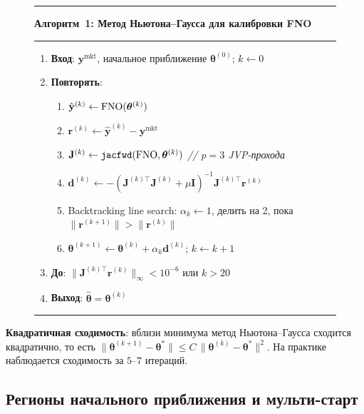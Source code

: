 \begin{figure}[H]
\hrule\vspace{0.4em}
\noindent\textbf{Алгоритм~1: Метод Ньютона--Гаусса для калибровки FNO}
\vspace{0.3em}\hrule\vspace{0.4em}
\begin{enumerate}[leftmargin=2em, label=\arabic*.]
  \item \textbf{Вход}: $\mathbf{y}^{\mathrm{mkt}}$, начальное приближение $\boldsymbol\theta^{(0)}$; $k \leftarrow 0$
  \item \textbf{Повторять}:
  \begin{enumerate}[leftmargin=1.5em, label=\alph*.]
    \item $\hat{\mathbf{y}}^{(k)} \leftarrow \mathrm{FNO}(\boldsymbol\theta^{(k)})$
    \item $\mathbf{r}^{(k)} \leftarrow \hat{\mathbf{y}}^{(k)} - \mathbf{y}^{\mathrm{mkt}}$
    \item $\mathbf{J}^{(k)} \leftarrow \texttt{jacfwd}(\mathrm{FNO}, \boldsymbol\theta^{(k)})$ \quad \textit{// $p=3$ JVP-прохода}
    \item $\mathbf{d}^{(k)} \leftarrow -(\mathbf{J}^{(k)\top}\mathbf{J}^{(k)} + \mu\mathbf{I})^{-1}\mathbf{J}^{(k)\top}\mathbf{r}^{(k)}$
    \item Backtracking line search: $\alpha_k \leftarrow 1$, делить на 2, пока $\|\mathbf{r}^{(k+1)}\| > \|\mathbf{r}^{(k)}\|$
    \item $\boldsymbol\theta^{(k+1)} \leftarrow \boldsymbol\theta^{(k)} + \alpha_k \mathbf{d}^{(k)}$; $k \leftarrow k+1$
  \end{enumerate}
  \item \textbf{До}: $\|\mathbf{J}^{(k)\top}\mathbf{r}^{(k)}\|_\infty < 10^{-6}$ или $k > 20$
  \item \textbf{Выход}: $\hat{\boldsymbol\theta} = \boldsymbol\theta^{(k)}$
\end{enumerate}
\vspace{0.2em}\hrule
\label{alg:newton}
\end{figure}

\textbf{Квадратичная сходимость}: вблизи минимума метод Ньютона--Гаусса
сходится квадратично, то есть $\|\boldsymbol\theta^{(k+1)} - \boldsymbol\theta^*\| \leq C\,
\|\boldsymbol\theta^{(k)} - \boldsymbol\theta^*\|^2$. На практике наблюдается
сходимость за $5$--$7$ итераций.

\subsection{Регионы начального приближения и мульти-старт}

